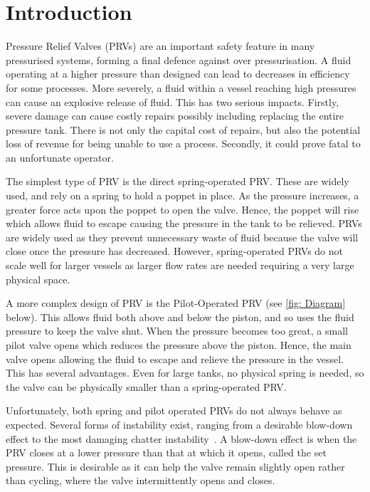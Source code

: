 \chapter{Introduction}

Pressure Relief Valves (PRVs) are an important safety feature in many pressurised systems, forming a final defence against over pressurisation. A fluid operating at a higher pressure than designed can lead to decreases in efficiency for some processes. More severely, a fluid within a vessel reaching high pressures can cause an explosive release of fluid. This has two serious impacts. Firstly, severe damage can cause costly repairs possibly including replacing the entire pressure tank. There is not only the capital cost of repairs, but also the potential loss of revenue for being unable to use a process. Secondly, it could prove fatal to an unfortunate operator.

The simplest type of PRV is the direct spring-operated PRV. These are widely used, and rely on a spring to hold a poppet in place. As the pressure increases, a greater force acts upon the poppet to open the valve. Hence, the poppet will rise which allows fluid to escape causing the pressure in the tank to be relieved. PRVs are widely used as they prevent unnecessary waste of fluid because the valve will close once the pressure has decreased. However, spring-operated PRVs do not scale well for larger vessels as larger flow rates are needed requiring a very large physical space.

A more complex design of PRV is the Pilot-Operated PRV (see \cref{fig: Diagram} below). This allows fluid both above and below the piston, and so uses the fluid pressure to keep the valve shut. When the pressure becomes too great, a small pilot valve opens which reduces the pressure above the piston. Hence, the main valve opens allowing the fluid to escape and relieve the pressure in the vessel. This has several advantages. Even for large tanks, no physical spring is needed, so the valve can be physically smaller than a spring-operated PRV.

Unfortunately, both spring and pilot operated PRVs do not always behave as expected. Several forms of instability exist, ranging from a desirable blow-down effect to the most damaging chatter instability~\cite{Hos2017DynamicRecommendations}. A blow-down effect is when the PRV closes at a lower pressure than that at which it opens, called the set pressure. This is desirable as it can help the valve remain slightly open rather than cycling, where the valve intermittently opens and closes.

